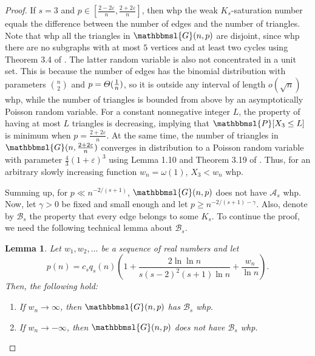 \documentclass[hidelinks, 11pt]{article}
\theoremstyle{plain}
\newtheorem{lemma}[theorem]{Lemma}
\theoremstyle{definition}
\begin{document}
\begin{proof}
If $s=3$ and $p\in[\tfrac{2-2\varepsilon}{n}, \tfrac{2+2\varepsilon}{n}]$,  then  whp   the weak $K_s$-saturation number    equals the difference between the number of edges and the number of triangles. Note that whp all the triangles in $\mathbbmsl{G}(n, p)$ are disjoint,  since whp there are no subgraphs with at most $5$ vertices and at least two cycles  using   Theorem 3.4 of   \cite{RG}. The latter random variable is also not concentrated in a unit set. This is because the number of edges has the binomial distribution with parameters ${n\choose 2}$ and $p=\mathnormal{\Theta}(\tfrac{1}{n})$,  so
it is outside any interval of length  $o(\sqrt{n})$ whp,  while the number of triangles is bounded from above by an asymptotically Poisson random variable.  For a constant nonnegative  integer  $L$, the property of having at most $L$ triangles is   decreasing,  implying that $\mathbbmsl{P}[X_3\leq L]$ is minimum when $p=\tfrac{2+2\varepsilon}{n}$. At the same time,  the number of  triangles in $\mathbbmsl{G}(n, \tfrac{2+2\varepsilon}{n})$ converges in distribution to
a Poisson random variable with parameter $\tfrac{4}{3}(1+\varepsilon)^3$
using    Lemma 1.10 and Theorem 3.19 of \cite{RG}. Thus,   for an arbitrary slowly increasing function $w_n=\omega(1)$,   $X_3<w_n$ whp.


Summing up, for $p\ll n^{-2/(s+1)}$,   $\mathbbmsl{G}(n,p)$ does not have $\mathcal{A}_s$ whp.
Now, let $\gamma>0$ be fixed and small enough  and  let $p\geq n^{-2/(s+1)-\gamma}$. Also, denote  by $\mathcal{B}_s$ the property  that every edge belongs to some $K_s$. To continue  the proof, we need the following technical lemma about $\mathcal{B}_s$.



\begin{lemma}\label{edge_in_clique}
Let $w_1, w_2, \ldots$ be a sequence of real numbers  and let
$$p(n)=c_sq_s(n)\left(1+\frac{2\ln\ln n}{s(s-2)^2(s+1)\ln n}+\frac{w_n}{\ln n}\right).$$
Then, the  following hold:
\begin{enumerate}
\item[{\rm (i)}] If $w_n\to\infty$, then   $\mathbbmsl{G}(n,p)$ has $\mathcal{B}_s$ whp.
\item[{\rm (ii)}] If $w_n\to-\infty$, then   $\mathbbmsl{G}(n,p)$ does not have $\mathcal{B}_s$ whp.
\end{enumerate}
\end{lemma}




\end{proof}
\end{document}
